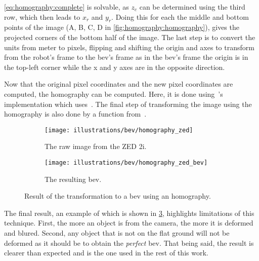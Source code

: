 \cref{eq:homography:complete} is solvable, as $z_c$ can be determined using the third row, which then leads to $x_r$ and $y_r$.
Doing this for each the middle and bottom points of the image (A, B, C, D in \cref{fig:homography:homography}), gives
the projected corners of the bottom half of the image.
The last step is to convert the units from meter to pixels, flipping and shifting the origin and axes to transform from the robot's frame
to the \gls{bev}'s frame as in the bev's frame the origin is in the top-left corner while the x and y axes are in the opposite direction.


Now that the original pixel coordinates and the new pixel coordinates are computed, the homography can be computed.
Here, it is done using~'s implementation which uses~.
The final step of transforming the image using the homography is also done by a function from~.


\begin{figure}[ht!]
    \begin{subfigure}[t]{0.35\textwidth}
        \texttt{[image: illustrations/bev/homography\_zed]}
        \caption{The raw image from the ZED 2i.}
        \label{fig:homography:zed}
    \end{subfigure}
    \hfill
    \begin{subfigure}[t]{0.58\textwidth}
        \texttt{[image: illustrations/bev/homography\_zed\_bev]}
        \caption{The resulting \gls{bev}.}
        \label{fig:homography:zed_bev}
    \end{subfigure}
    \hfill
    \caption{Result of the transformation to a \gls{bev} using an homography.}
    \label{fig:homography:example}
\end{figure}

The final result, an example of which is shown in \cref{fig:homography:example}, highlights limitations of this technique.
First, the more an object is from the camera, the more it is deformed and blured.
Second, any object that is not on the flat ground will not be deformed as it should be to obtain the \textit{perfect} \gls{bev}.
That being said, the result is clearer than expected and is the one used in the rest of this work.